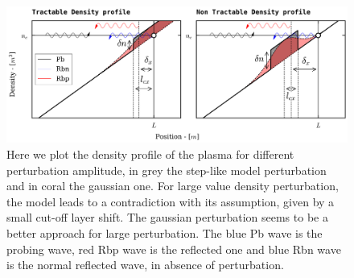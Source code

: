 \documentclass[11pt,a4paper]{report}
\begin{document}
\begin{figure}[H]
    \centering
    \includegraphics[width = 1\linewidth]{./figures/density_profile.png}
    \caption{Here we plot the density profile of the plasma for different perturbation amplitude, in grey the step-like model perturbation and in coral the gaussian one. For large value density perturbation, the model leads to a contradiction with its assumption, given by a small cut-off layer shift.
        The gaussian perturbation seems to be a better approach for large perturbation. The blue Pb wave is the probing wave, red Rbp wave is the reflected one and blue Rbn wave is the normal reflected wave, in absence of perturbation.}
    \label{}
\end{figure}
\end{document}
